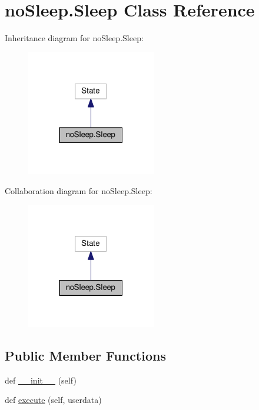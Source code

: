 \hypertarget{classnoSleep_1_1Sleep}{}\section{no\+Sleep.\+Sleep Class Reference}
\label{classnoSleep_1_1Sleep}


Inheritance diagram for no\+Sleep.\+Sleep\+:
\nopagebreak
\begin{figure}[H]
\begin{center}
\leavevmode
\includegraphics[width=160pt]{classnoSleep_1_1Sleep__inherit__graph}
\end{center}
\end{figure}


Collaboration diagram for no\+Sleep.\+Sleep\+:
\nopagebreak
\begin{figure}[H]
\begin{center}
\leavevmode
\includegraphics[width=160pt]{classnoSleep_1_1Sleep__coll__graph}
\end{center}
\end{figure}
\subsection*{Public Member Functions}
\begin{DoxyCompactItemize}
\item 
def \hyperlink{classnoSleep_1_1Sleep_a5e503c196ce370db0858f3bc1f26a5e4}{\+\_\+\+\_\+init\+\_\+\+\_\+} (self)
\item 
def \hyperlink{classnoSleep_1_1Sleep_a1766a04aa16120154e8f72359d9603a3}{execute} (self, userdata)
\end{DoxyCompactItemize}
